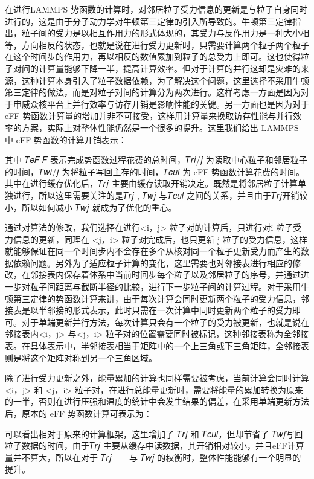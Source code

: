 在进行LAMMPS 势函数的计算时，对邻居粒子受力信息的更新是与粒子自身同时进行的，这是由于分子动力学对牛顿第三定律的引入所导致的。牛顿第三定律指出，粒子间的受力是以相互作用力的形式体现的，其受力与反作用力是一种大小相等，方向相反的状态，也就是说在进行受力更新时，只需要计算两个粒子两个粒子在这个时间步的作用力，再以相反的数值累加到粒子的总受力上即可。这也使得粒子对间的计算量能够下降一半，提高计算效率。但对于计算的并行这却是灾难的来源，这种计算本身引入了粒子数据依赖，为了解决这个问题，这里选择不采用牛顿第三定律的做法，而是对粒子对间的计算分为两次进行。这样考虑一方面是因为对于申威众核平台上并行效率与访存开销是影响性能的关键。另一方面也是因为对于eFF 势函数计算量的增加并非不可接受，这样用计算量来换取访存性能与并行效率的方案，实际上对整体性能仍然是一个很多的提升。这里我们给出 LAMMPS 中 eFF 势函数的计算开销表示：

其中 𝑇𝑒𝐹 𝐹 表示完成势函数过程花费的总时间，𝑇𝑟𝑖/𝑗 为读取中心粒子和邻居粒子的时间，𝑇𝑤𝑖/𝑗 为将粒子写回主存的时间，𝑇𝑐𝑢𝑙 为 eFF 势函数计算花费的时间。其中在进行缓存优化后，𝑇𝑟𝑗 主要由缓存读取开销决定。既然是将邻居粒子计算单独进行，所以这里需要关注的是𝑇𝑟𝑗 , 𝑇𝑤𝑗 与𝑇𝑐𝑢𝑙 之间的关系，并且由于𝑇𝑟𝑗开销较小，所以如何减小 𝑇𝑤𝑗 就成为了优化的重心。

通过对算法的修改，我们选择在进行<i，j> 粒子对的计算后，只进行对i 粒子受力信息的更新，同理在 <j，i> 粒子对完成后，也只更新 j 粒子的受力信息，这样就能够保证在同一个时间步内不会存在多个从核对同一个粒子更新受力而产生的数据依赖问题。另外为了适应粒子计算的变化，这里需要也对邻接表进行相应的修改，在邻接表内保存着体系中当前时间步每个粒子以及邻居粒子的序号，并通过进一步对粒子间距离与截断半径的比较，进行下一步粒子间的计算过程。对于采用牛顿第三定律的势函数计算来讲，由于每次计算会同时更新两个粒子的受力信息，邻接表是以半邻接的形式表示，此时只需在一次计算中同时更新两个粒子的受力即可。对于单端更新并行方法，每次计算只会有一个粒子的受力被更新，也就是说在邻接表内<i，j> 与<j，i> 粒子对的位置需要同时被标记，这种邻接表称为全邻接表。在具体表示中，半邻接表相当于矩阵中的一个上三角或下三角矩阵，全邻接表则是将这个矩阵对称到另一个三角区域。

除了进行受力更新之外，能量累加的计算也同样需要被考虑，当前计算会同时计算 <i，j> 和 <j，i> 粒子对，在进行总能量更新时，需要将能量的累加转换为原来的一半，否则在进行压强和温度的统计中会发生结果的偏差，在采用单端更新方法后，原本的 eFF 势函数计算可表示为：

可以看出相对于原来的计算框架，这里增加了 𝑇𝑟𝑗 和 𝑇𝑐𝑢𝑙，但却节省了 𝑇𝑤𝑗写回粒子数据的时间，由于𝑇𝑟𝑗 主要从缓存中读数据，其开销相对较小，并且eFF计算量并不算大，所以在对于 𝑇𝑟𝑗 􀀁𝑇𝑐𝑢𝑙 与 𝑇𝑤𝑗 的权衡时，整体性能能够有一个明显的提升。

